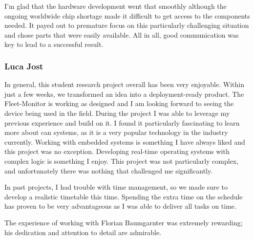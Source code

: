 I'm glad that the hardware development went that smoothly although the ongoing worldwide chip shortage made it difficult to get access to the components needed. It payed out to premature focus on this particularly challenging situation and chose parts that were easily available. All in all, good communication was key to lead to a successful result.

\subsubsection{Luca Jost}
In general, this student research project overall has been very enjoyable. Within just a few weeks, we transformed an idea into a deployment-ready product. The Fleet-Monitor is working as designed and I am looking forward to seeing the device being used in the field. During the project I was able to leverage my previous experience and build on it. I found it particularly fascinating to learn more about \acrshort{can} systems, as it is a very popular technology in the industry currently. Working with embedded systems is something I have always liked and this project was no exception. Developing real-time operating systems with complex logic is something I enjoy. This project was not particularly complex, and unfortunately there was nothing that challenged me significantly.

In past projects, I had trouble with time management, so we made sure to develop a realistic timetable this time. Spending the extra time on the schedule has proven to be very advantageous as I was able to deliver all tasks on time. 

The experience of working with Florian Baumgarnter was extremely rewarding; his dedication and attention to detail are admirable. 